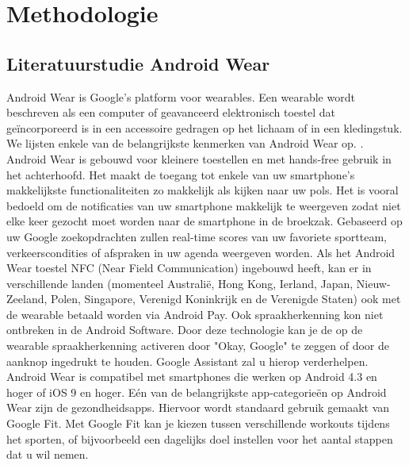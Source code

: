 
\chapter{Methodologie}
\label{ch:methodologie}


\section{Literatuurstudie Android Wear}
\label{sec:androidwear}
Android Wear is Google's platform voor wearables. Een wearable wordt beschreven als een computer of geavanceerd elektronisch toestel dat geïncorporeerd is in een accessoire gedragen op het lichaam of in een kledingstuk. \autocite{Dictionary}
We lijsten enkele van de  belangrijkste kenmerken van Android Wear op. \autocite{Techradar}.
Android Wear is gebouwd voor kleinere toestellen en met hands-free gebruik in het achterhoofd. Het maakt de toegang tot enkele van uw smartphone's makkelijkste functionaliteiten zo makkelijk als kijken naar uw pols. Het is vooral bedoeld om de notificaties van uw smartphone makkelijk te weergeven zodat niet elke keer gezocht moet worden naar de smartphone in de broekzak. Gebaseerd op uw Google zoekopdrachten zullen real-time scores van uw favoriete sportteam, verkeerscondities of afspraken in uw agenda weergeven worden. Als het Android Wear toestel NFC (Near Field Communication) ingebouwd heeft, kan er in verschillende landen (momenteel Australië, Hong Kong, Ierland, Japan, Nieuw-Zeeland, Polen, Singapore, Verenigd Koninkrijk en de Verenigde Staten) ook met de wearable betaald worden via Android Pay. \autocite{Androidpay} Ook spraakherkenning kon niet ontbreken in de Android Software. Door deze technologie kan je de op de wearable spraakherkenning activeren door "Okay, Google" te zeggen of door de aanknop ingedrukt te houden. Google Assistant zal u hierop verderhelpen. Android Wear is compatibel met smartphones die werken op Android 4.3 en hoger of iOS 9 en hoger. Eén van de belangrijkste app-categorieën op Android Wear zijn de gezondheidsapps. Hiervoor wordt standaard gebruik gemaakt van Google Fit. Met Google Fit kan je kiezen tussen verschillende workouts tijdens het sporten, of bijvoorbeeld een dagelijks doel instellen voor het aantal stappen dat u wil nemen.  
